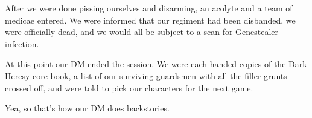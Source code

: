 After we were done pissing ourselves and disarming, an acolyte and a team of medicae entered. 
We were informed that our regiment had been disbanded, we were officially dead, and we would all be subject to a scan for Genestealer infection. %

At this point our DM ended the session. 
We were each handed copies of the Dark Heresy core book, a list of our surviving guardsmen with all the filler grunts crossed off, and were told to pick our characters for the next game.

Yea, so that's how our DM does backstories.







